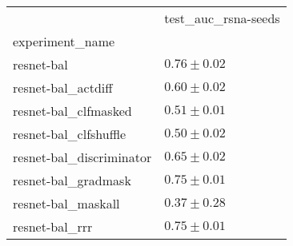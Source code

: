 \begin{tabular}{ll}
\toprule
{} & test_auc_rsna-seeds \\
experiment_name          &                     \\
\midrule
resnet-bal               &       $0.76\pm0.02$ \\
resnet-bal_actdiff       &       $0.60\pm0.02$ \\
resnet-bal_clfmasked     &       $0.51\pm0.01$ \\
resnet-bal_clfshuffle    &       $0.50\pm0.02$ \\
resnet-bal_discriminator &       $0.65\pm0.02$ \\
resnet-bal_gradmask      &       $0.75\pm0.01$ \\
resnet-bal_maskall       &       $0.37\pm0.28$ \\
resnet-bal_rrr           &       $0.75\pm0.01$ \\
\bottomrule
\end{tabular}
